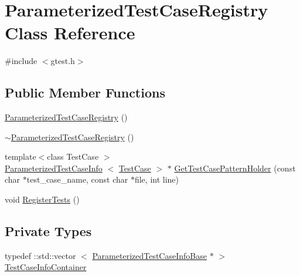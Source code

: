 \hypertarget{classtesting_1_1internal_1_1ParameterizedTestCaseRegistry}{\section{\-Parameterized\-Test\-Case\-Registry \-Class \-Reference}
\label{d3/dd0/classtesting_1_1internal_1_1ParameterizedTestCaseRegistry}
}


{\ttfamily \#include $<$gtest.\-h$>$}

\subsection*{\-Public \-Member \-Functions}
\begin{DoxyCompactItemize}
\item 
\hyperlink{classtesting_1_1internal_1_1ParameterizedTestCaseRegistry_aa0720d76362ab76cd008a98a976bbc34}{\-Parameterized\-Test\-Case\-Registry} ()
\item 
\hyperlink{classtesting_1_1internal_1_1ParameterizedTestCaseRegistry_ac74d7de838869f7971997c61a97dafd3}{$\sim$\-Parameterized\-Test\-Case\-Registry} ()
\item 
{\footnotesize template$<$class Test\-Case $>$ }\\\hyperlink{classtesting_1_1internal_1_1ParameterizedTestCaseInfo}{\-Parameterized\-Test\-Case\-Info}\*
$<$ \hyperlink{classtesting_1_1TestCase}{\-Test\-Case} $>$ $\ast$ \hyperlink{classtesting_1_1internal_1_1ParameterizedTestCaseRegistry_a308b866e4aa3ffc18d7ea01047bc4157}{\-Get\-Test\-Case\-Pattern\-Holder} (const char $\ast$test\-\_\-case\-\_\-name, const char $\ast$file, int line)
\item 
void \hyperlink{classtesting_1_1internal_1_1ParameterizedTestCaseRegistry_ad7b8501e8086a10448dba6ac0d0d448c}{\-Register\-Tests} ()
\end{DoxyCompactItemize}
\subsection*{\-Private \-Types}
\begin{DoxyCompactItemize}
\item 
typedef \-::std\-::vector\*
$<$ \hyperlink{classtesting_1_1internal_1_1ParameterizedTestCaseInfoBase}{\-Parameterized\-Test\-Case\-Info\-Base} $\ast$ $>$ \hyperlink{classtesting_1_1internal_1_1ParameterizedTestCaseRegistry_a10ec5a4c58b471acb6ee18cbdf3388f3}{\-Test\-Case\-Info\-Container}
\end{DoxyCompactItemize}
